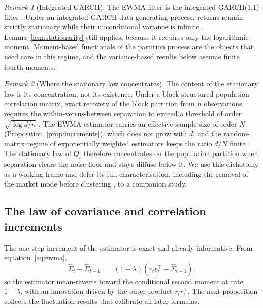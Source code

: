 \documentclass[11pt]{article}
\theoremstyle{remark}
\newtheorem{remark}{Remark}
\begin{document}
\begin{remark}[Integrated GARCH]
\label{rem:igarch}
The EWMA filter is the integrated GARCH(1,1) filter \citep{riskmetrics1996}.
Under an integrated GARCH data-generating process, returns remain strictly
stationary while their unconditional variance is infinite
\citep{nelson1990stationarity}. Lemma~\ref{lem:stationarity} still applies,
because it requires only the logarithmic moment. Moment-based functionals of
the partition process are the objects that need care in this regime, and the
variance-based results below assume finite fourth moments.
\end{remark}

\begin{remark}[Where the stationary law concentrates]
\label{rem:concentration}
The content of the stationary law is its concentration, not its existence.
Under a block-structured population correlation matrix, exact recovery of the
block partition from $n$ observations requires the within-versus-between
separation to exceed a threshold of order $\sqrt{\log d / n}$
\citep{bunea2020model}. The EWMA estimator carries an effective sample size of
order $N$ (Proposition~\ref{prop:increments}), which does not grow with $d$,
and the random-matrix regime of exponentially weighted estimators keeps the
ratio $d/N$ finite \citep{pafka2004exponential}. The stationary law of $Q_t$
therefore concentrates on the population partition when separation clears the
noise floor and stays diffuse below it. We use this dichotomy as a working
frame and defer its full characterisation, including the removal of the market
mode before clustering \citep{laloux1999noise, lopezdeprado2020machine}, to a
companion study.
\end{remark}

\subsection{The law of covariance and correlation increments}
\label{sec:increments}

The one-step increment of the estimator is exact and already informative. From
equation~\eqref{eq:ewma},
\begin{equation}
\widehat{\Sigma}_t - \widehat{\Sigma}_{t-1}
\;=\; (1-\lambda)\left( r_t r_t^{\top} - \widehat{\Sigma}_{t-1} \right),
\label{eq:increment}
\end{equation}
so the estimator mean-reverts toward the conditional second moment at rate
$1-\lambda$, with an innovation driven by the outer product $r_t r_t^{\top}$.
The next proposition collects the fluctuation results that calibrate all later
formulas.
\end{document}
